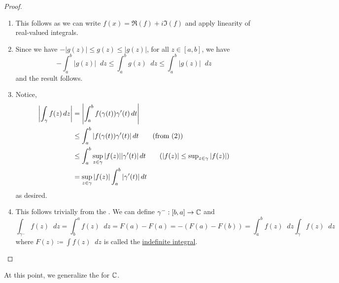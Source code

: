 \documentclass[11pt]{article}
\newcommand*\dif{\mathop{}\!d}
\begin{document}
\begin{proof}\leavevmode
	\begin{enumerate}
		\item This follows as we can write $f(x) = \Re(f)+i\Im(f)$ and apply linearity
			of real-valued integrals.
		\item Since we have $-|g(z)| \leq g(z) \leq |g(z)|$, for all $z \in [a,b]$, we
			have
			\begin{equation*}
				-\int_a^b |g(z)| \dif z \leq \int_a^b g(z) \dif z \leq \int_a^b |g(z)| \dif z
			\end{equation*}
			and the result follows.
		\item Notice,
			\begin{align*}
				\left| \int_\gamma f(z) \dif z\right|
				&= \left| \int_a^b f(\gamma(t))\gamma'(t)\dif t\right|\\
				&\leq \int_a^b |f(\gamma(t))\gamma'(t)| \dif t \tag{from (2)}\\
				&\leq \int_a^b \sup_{z\in\gamma} |f(z)| |\gamma'(t)| \dif t \tag{$|f(z)|\leq
			\sup_{z\in\gamma}|f(z)|$}\\
			&= \sup_{z\in\gamma} |f(z)| \int_a^b |\gamma'(t)| \dif t
		\end{align*}
		as desired.
	\item This follows trivially from the . We can
		define $\gamma^-:[b,a] \to \mathbb{C}$ and
		\begin{equation*}
			\int_{\gamma^-} f(z) \dif z
			= \int_b^a f(z) \dif z
			= F(a)-F(a)
			= -(F(a)-F(b))
			= \int_a^b f(z) \dif z
			\int_{\gamma} f(z) \dif z
		\end{equation*}
		where $F(z) \coloneqq \int f(z) \dif z$ is called the \underline{indefinite
		integral}.
\end{enumerate}
\end{proof}
At this point, we generalize the  for $\mathbb{C}$.
\end{document}
